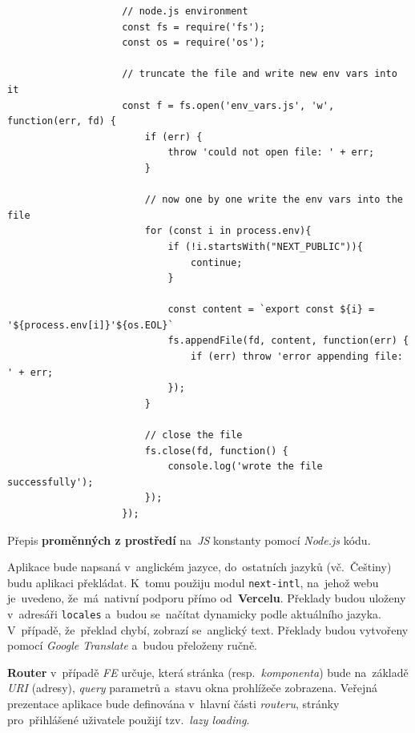 \documentclass[11pt,a4paper]{report}
\let\oldacrshort\acrshort
\renewcommand{\acrshort}[1]{\emph{\normalsize\color[rgb]{0,0,0}\noindent\oldacrshort{#1}}}
\begin{document}
            \begin{code}
                \begin{verbatim}
                    // node.js environment
                    const fs = require('fs');
                    const os = require('os');
                    
                    // truncate the file and write new env vars into it
                    const f = fs.open('env_vars.js', 'w', function(err, fd) {
                        if (err) {
                            throw 'could not open file: ' + err;
                        }
                    
                        // now one by one write the env vars into the file
                        for (const i in process.env){
                            if (!i.startsWith("NEXT_PUBLIC")){
                                continue;
                            }
                    
                            const content = `export const ${i} = '${process.env[i]}'${os.EOL}`
                            fs.appendFile(fd, content, function(err) {
                                if (err) throw 'error appending file: ' + err;
                            });        
                        }
                    
                        // close the file
                        fs.close(fd, function() {
                            console.log('wrote the file successfully');
                        });
                    });
                \end{verbatim}
                \caption{Přepis \textbf{proměnných z prostředí} na~\acrshort{JS} konstanty pomocí \emph{Node.js} kódu.}
                \label{js:env}
            \end{code}

            Aplikace bude napsaná v~anglickém jazyce, do~ostatních jazyků (vč.~Češtiny) budu aplikaci překládat. K~tomu použiju modul \texttt{next-intl}, na~jehož webu je~uvedeno, že~má~nativní podporu přímo od~\textbf{Vercelu}. Překlady budou uloženy v~adresáři \texttt{locales} a~budou se~načítat dynamicky podle aktuálního jazyka. V~případě, že~překlad chybí, zobrazí se~anglický text. Překlady budou vytvořeny pomocí \emph{Google Translate} a~budou přeloženy ručně.

            \textbf{Router} v~případě \acrshort{FE} určuje, která stránka (resp.~\emph{komponenta}) bude na~základě \acrshort{URI} (adresy), \emph{query} parametrů a~stavu okna prohlížeče zobrazena. Veřejná prezentace aplikace bude definována v~hlavní části \emph{routeru}, stránky pro~přihlášené uživatele použijí tzv.~\emph{lazy loading}.
\end{document}
